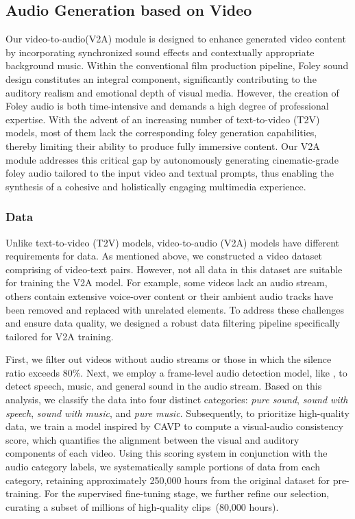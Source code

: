 \subsection{Audio Generation based on Video}

Our video-to-audio(V2A) module is designed to enhance generated video content by incorporating synchronized sound effects and contextually appropriate background music. Within the conventional film production pipeline, Foley sound design constitutes an integral component, significantly contributing to the auditory realism and emotional depth of visual media. However, the creation of Foley audio is both time-intensive and demands a high degree of professional expertise. With the advent of an increasing number of text-to-video (T2V) models, most of them lack the corresponding foley generation capabilities, thereby limiting their ability to produce fully immersive content. Our V2A module addresses this critical gap by autonomously generating cinematic-grade foley audio tailored to the input video and textual prompts, thus enabling the synthesis of a cohesive and holistically engaging multimedia experience.

\subsubsection{Data }
Unlike text-to-video (T2V) models, video-to-audio (V2A) models have different requirements for data. As mentioned above, we constructed a video dataset comprising of video-text pairs. However, not all data in this dataset are suitable for training the V2A model. For example, some videos lack an audio stream, others contain extensive voice-over content or their ambient audio tracks have been removed and replaced with unrelated elements. To address these challenges and ensure data quality, we designed a robust data filtering pipeline specifically tailored for V2A training.

First, we filter out videos without audio streams or those in which the silence ratio exceeds 80\%. Next, we employ a frame-level audio detection model, like \cite{Hung2022}, to detect speech, music, and general sound in the audio stream. Based on this analysis, we classify the data into four distinct categories: \textit{pure sound}, \textit{sound with speech}, \textit{sound with music}, and \textit{pure music}. Subsequently, to prioritize high-quality data, we train a model inspired by CAVP \cite{luo2024diff} to compute a visual-audio consistency score, which quantifies the alignment between the visual and auditory components of each video. Using this scoring system in conjunction with the audio category labels, we systematically sample portions of data from each category, retaining approximately 250,000 hours from the original dataset for pre-training. For the supervised fine-tuning stage, we further refine our selection, curating a subset of millions of high-quality clips~(80,000 hours).

